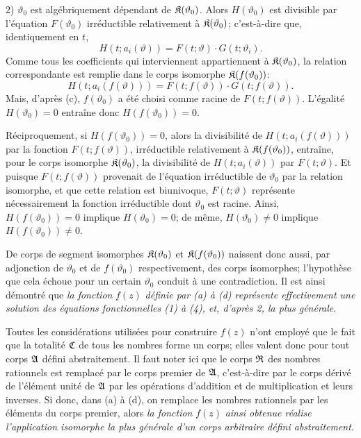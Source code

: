 2) $\vartheta_0$ est algébriquement dépendant de $\mathfrak{K}(\vartheta_0)$. Alors $H(\vartheta_0)$ est divisible par l'équation $F(\vartheta_0)$ irréductible relativement à $\mathfrak{K}(\vartheta_0)$; c'est-à-dire que, identiquement en $t$,
\[
H(t;a_i(\vartheta))=F(t;\vartheta)\cdot G(t;\vartheta_i).
\]
Comme tous les coefficients qui interviennent appartiennent à $\mathfrak{K}(\vartheta_0)$, la relation correspondante est remplie dans le corps isomorphe $\mathfrak{K}(f(\vartheta_0))$:
\[
H(t;a_i(f(\vartheta)))=F(t;f(\vartheta))\cdot G(t;f(\vartheta)).
\]
Mais, d'après (c), $f(\vartheta_0)$ a été choisi comme racine de $F(t;f(\vartheta))$. L'égalité $H(\vartheta_0)=0$ entraîne donc $H(f(\vartheta_0))=0$.

Réciproquement, si $H(f(\vartheta_0))=0$, alors la divisibilité de $H(t;a_i(f(\vartheta)))$ par la fonction $F(t;f(\vartheta))$, irréductible relativement à $\mathfrak{K}(f(\vartheta_0))$, entraîne, pour le corps isomorphe $\mathfrak{K}(\vartheta_0)$, la divisibilité de $H(t;a_i(\vartheta))$ par $F(t;\vartheta)$. Et puisque $F(t;f(\vartheta))$ provenait de l'équation irréductible de $\vartheta_0$ par la relation isomorphe, et que cette relation est biunivoque, $F(t;\vartheta)$ représente nécessairement la fonction irréductible dont $\vartheta_0$ est racine. Ainsi, $H(f(\vartheta_0))=0$ implique $H(\vartheta_0)=0$; de même, $H(\vartheta_0)\ne0$ implique $H(f(\vartheta_0))\ne0$.

De corps de segment isomorphes $\mathfrak{K}(\vartheta_0)$ et $\mathfrak{K}(f(\vartheta_0))$ naissent donc aussi, par adjonction de $\vartheta_0$ et de $f(\vartheta_0)$ respectivement, des corps isomorphes; l'hypothèse que cela échoue pour un certain $\vartheta_0$ conduit à une contradiction. Il est ainsi démontré que \emph{la fonction} $f(z)$ \emph{définie par (a) à (d) représente effectivement une solution des équations fonctionnelles (1) à (4), et, d'après 2, la plus générale}.

Toutes les considérations utilisées pour construire $f(z)$ n'ont employé que le fait que la totalité $\mathfrak{C}$ de tous les nombres forme un corps; elles valent donc pour tout corps $\mathfrak{A}$ défini abstraitement. Il faut noter ici que le corps $\mathfrak{R}$ des nombres rationnels est remplacé par le \og{}corps premier\fg{} de $\mathfrak{A}$, c'est-à-dire par le corps dérivé de l'élément unité de $\mathfrak{A}$ par les opérations d'addition et de multiplication et leurs inverses. Si donc, dans (a) à (d), on remplace les nombres rationnels par les éléments du corps premier, alors \emph{la fonction} $f(z)$ \emph{ainsi obtenue réalise l'application isomorphe la plus générale d'un corps arbitraire défini abstraitement}.

